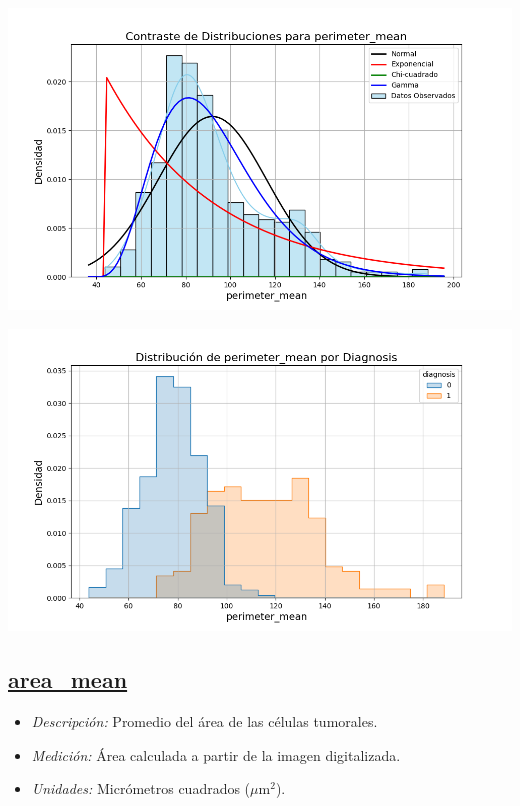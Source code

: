 \documentclass[a4paper, 12pt]{article}
\begin{document}
\includegraphics[width=\textwidth]{../Plots/plots_stats/perimeter_mean/distribuciones_conocidas_perimeter_mean.png}

\includegraphics[width=\textwidth]{../Plots/plots_diagnosis/distribucion_perimeter_mean_por_diagnosis.png}


\subsection*{\underline{area\_mean}}

 \begin{itemize}
	\item \textit{Descripción:} Promedio del área de las células tumorales.
	\item \textit{Medición:} Área calculada a partir de la imagen digitalizada.
	\item \textit{Unidades:} Micrómetros cuadrados ($\mu$m$^2$).
\end{itemize}
\end{document}
